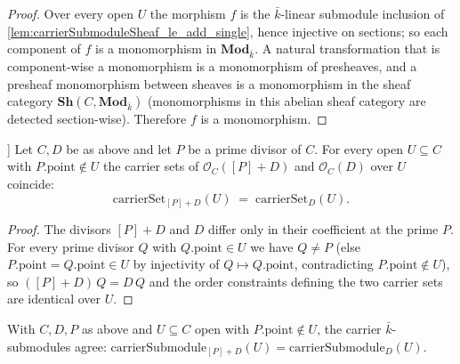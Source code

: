 \begin{proof}
  Over every open \(U\) the morphism \(f\) is the \(\bar k\)-linear submodule
  inclusion of \cref{lem:carrierSubmoduleSheaf_le_add_single}, hence injective
  on sections; so each component of \(f\) is a monomorphism in
  \(\mathbf{Mod}_{\bar k}\). A natural transformation that is component-wise a
  monomorphism is a monomorphism of presheaves, and a presheaf monomorphism
  between sheaves is a monomorphism in the sheaf category
  \(\mathbf{Sh}(C, \mathbf{Mod}_{\bar k})\) (monomorphisms in this abelian
  sheaf category are detected section-wise). Therefore \(f\) is a monomorphism.
\end{proof}

\begin{lemma}\leanok
[Away from \(P\): the carrier set is unchanged by \([P]\)]
  \label{lem:carrierSet_add_single_eq_of_not_mem}
  Let \(C, D\) be as above and let \(P\) be a prime divisor of \(C\). For every
  open \(U \subseteq C\) with \(P.\mathrm{point} \notin U\) the carrier sets of
  \(\mathcal O_C([P]+D)\) and \(\mathcal O_C(D)\) over \(U\) coincide:
  \[
    \mathrm{carrierSet}_{[P]+D}(U) \;=\; \mathrm{carrierSet}_D(U).
  \]
\end{lemma}

\begin{proof}
  The divisors \([P]+D\) and \(D\) differ only in their coefficient at the prime
  \(P\). For every prime divisor \(Q\) with \(Q.\mathrm{point} \in U\) we have
  \(Q \neq P\) (else \(P.\mathrm{point} = Q.\mathrm{point} \in U\) by injectivity
  of \(Q \mapsto Q.\mathrm{point}\), contradicting \(P.\mathrm{point} \notin U\)), so \(([P]+D)\,Q = D\,Q\) and the
  order constraints defining the two carrier sets are identical over \(U\).
\end{proof}

\begin{lemma}
  \label{lem:carrierSubmodule_add_single_eq_of_not_mem}
  With \(C, D, P\) as above and \(U \subseteq C\) open with
  \(P.\mathrm{point} \notin U\), the carrier \(\bar k\)-submodules agree:
  \(\mathrm{carrierSubmodule}_{[P]+D}(U) = \mathrm{carrierSubmodule}_D(U)\).
\end{lemma}

